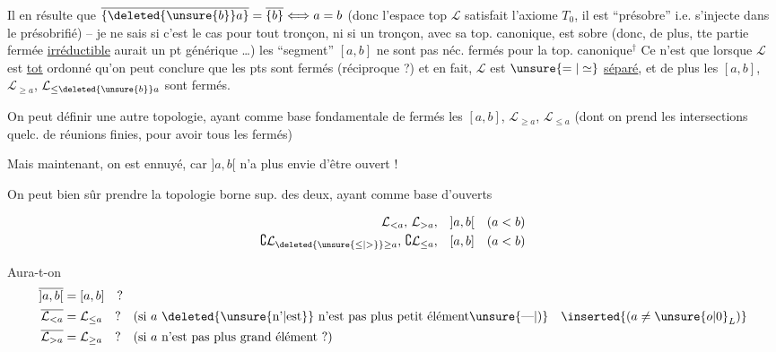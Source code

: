Il en résulte que $\overline{\{\deleted{\unsure{b}}a\}}=\overline{\{b\}}\Longleftrightarrow a=b$ (donc l'espace top $\mathcal L$ satisfait l'axiome $T_0$, il est ``présobre'' i.e. s'injecte dans le présobrifié) -- je ne sais si c'est
le cas pour tout tronçon, ni si un tronçon, avec sa top. canonique, est sobre (donc, de plus, tte partie fermée \uline{irréductible} aurait un pt générique \dots)
les ``segment'' $[a,b]$ ne sont pas néc. fermés pour la top. canonique$^{\dagger}$
Ce n'est que lorsque $\mathcal L$ est \uline{tot} ordonné qu'on peut conclure que les pts sont fermés (réciproque ?) et en fait, $\mathcal L$ est $\unsure{=|\simeq}$ \uline{séparé}, et de plus les $[a,b]$, $\mathcal L_{\geq a}$, $\mathcal L_{\leq\deleted{\unsure{b}}a}$ sont fermés.

On peut définir une autre topologie, ayant comme base fondamentale de fermés les $[a,b]$, $\mathcal L_{\geq a}$, $\mathcal L_{\leq a}$ (dont on prend les intersections quelc. de réunions finies, pour avoir tous les fermés)

Mais maintenant, on est ennuyé, car $]a,b[$ n'a plus envie d'être ouvert !

 On peut bien sûr prendre la topologie borne sup. des deux, ayant comme base d'ouverts

\[
\begin{aligned}
 \mathcal L_{<a},\,\mathcal L_{>a},\quad &]a,b[ && (a<b)\\
 \complement \mathcal L_{\deleted{\unsure{\leq|>}}\geq a},\,\complement \mathcal L_{\leq a},\quad &[a,b] && (a<b)
\end{aligned}
\]

\deleted{De sorte que $]a,b[$ \unsure{est|est un}}   

Aura-t-on \deleted{$b\in [a,b$}
\[
\begin{aligned}
 \overline{]a,b[}&=[a,b]\quad ?\\
 \overline{\mathcal L_{<a}}&=\mathcal L_{\leq a}\quad ?\quad \text{(si $a$ \deleted{\unsure{n'|est}} n'est pas plus petit élément\unsure{—|)}} \quad \inserted{(a\ne\unsure{o|0}_{L})}\\
 \overline{\mathcal L_{>a}}&=\mathcal L_{\geq a}\quad ?\quad \text{(si $a$ n'est pas plus grand élément ?)}
\end{aligned}
\]

